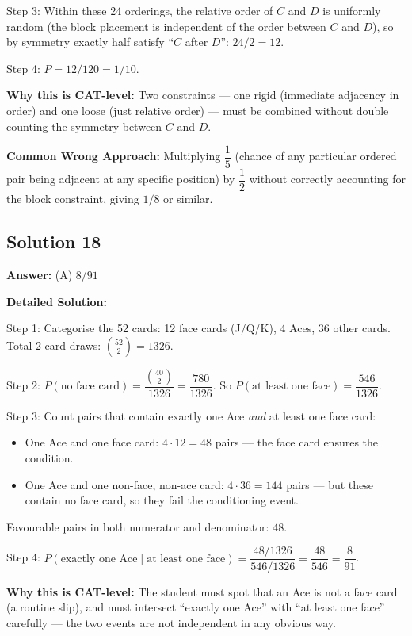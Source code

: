 \documentclass[11pt,a4paper]{article}
\begin{document}
Step 3: Within these 24 orderings, the relative order of \(C\) and \(D\) is uniformly random (the block placement is independent of the order between \(C\) and \(D\)), so by symmetry exactly half satisfy ``\(C\) after \(D\)'': \(24 / 2 = 12\).

Step 4: \(P = 12/120 = 1/10\).

\textbf{Why this is CAT-level:} Two constraints --- one rigid (immediate adjacency in order) and one loose (just relative order) --- must be combined without double counting the symmetry between \(C\) and \(D\).

\textbf{Common Wrong Approach:} Multiplying \(\dfrac{1}{5}\) (chance of any particular ordered pair being adjacent at any specific position) by \(\dfrac{1}{2}\) without correctly accounting for the block constraint, giving \(1/8\) or similar.

\subsection*{Solution 18}
\textbf{Answer:} (A) \(8/91\)

\textbf{Detailed Solution:}

Step 1: Categorise the 52 cards: 12 face cards (J/Q/K), 4 Aces, 36 other cards. Total 2-card draws: \(\binom{52}{2} = 1326\).

Step 2: \(P(\text{no face card}) = \dfrac{\binom{40}{2}}{1326} = \dfrac{780}{1326}\). So \(P(\text{at least one face}) = \dfrac{546}{1326}\).

Step 3: Count pairs that contain exactly one Ace \emph{and} at least one face card:
\begin{itemize}[leftmargin=*,topsep=0pt,itemsep=0pt]
    \item One Ace and one face card: \(4 \cdot 12 = 48\) pairs --- the face card ensures the condition.
    \item One Ace and one non-face, non-ace card: \(4 \cdot 36 = 144\) pairs --- but these contain no face card, so they fail the conditioning event.
\end{itemize}
Favourable pairs in both numerator and denominator: \(48\).

Step 4: \(P(\text{exactly one Ace} \mid \text{at least one face}) = \dfrac{48/1326}{546/1326} = \dfrac{48}{546} = \dfrac{8}{91}\).

\textbf{Why this is CAT-level:} The student must spot that an Ace is not a face card (a routine slip), and must intersect ``exactly one Ace'' with ``at least one face'' carefully --- the two events are not independent in any obvious way.
\end{document}
